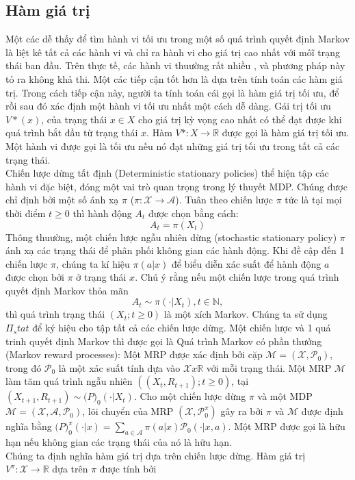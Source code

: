 \documentclass[14pt,a4paper,oneside]{report}		%
\begin{document}
\subsection{Hàm giá trị}
Một các dễ thấy để tìm hành vi tối ưu trong một số quá trình quyết định Markov là liệt kê tất cả các hành vi và chỉ ra hành vi cho giá trị cao nhất với môĩ trạng thái ban đầu. Trên thực tế, các hành vi thuường rất nhiều , và phương pháp này tỏ ra không khả thi. Một các tiếp cận tốt hơn là dựa trên tính toán các hàm giá trị. Trong cách tiếp cận này, người ta tính toán cái gọi là hàm giá trị tối ưu, để rồi sau đó xác định một hành vi tối ưu nhất một cách dễ dàng.
Gái trị tối ưu $V*(x)$, của trạng thái $x \in X$ cho giá trị kỳ vọng cao nhất có thể đạt được khi quá trình bắt đầu từ trạng thái $x$. Hàm $V* : X \rightarrow \mathbb{R}$ được gọi là hàm giá trị tối ưu. Một hành vi được gọi là tối ưu nếu nó đạt  những giá trị tối ưu trong tất cả các trạng thái.\\
Chiến lược dừng tất định (Deterministic stationary policies) thể hiện tập các hành vi đặc biệt, đóng một vai trò quan trọng trong lý thuyết MDP. Chúng được chỉ định bởi một số ánh xạ $\pi$ ($\pi : \mathcal{X}\rightarrow\mathcal{A}$). Tuân theo chiến lược $\pi$ tức là tại mọi thời điểm $t \geq 0$ thì hành động $A_t$ được chọn bằng cách:
\begin{equation} \label{eq6}
A_t = \pi (X_t)
\end{equation}
Thông thuường, một chiến lược ngẫu nhiên dừng (stochastic stationary policy) $\pi$ ánh xạ các trạng thái để phân phối không gian các hành động. Khi đề cập đến 1 chiến lược $\pi$, chúng ta kí hiệu $\pi (a|x)$ để biểu diễn xác suất để hành động $a$ được chọn bởi $\pi$ ở trạng thái $x$. Chú ý rằng nếu một chiến lược trong quá trình quyết định Markov thỏa mãn 
$$A_t  \sim \pi (\cdotp | X_t),  t \in \mathbb{N},$$ thì quá trình trạng thái $(X_t; t \geq 0)$ là một xích Markov. Chúng ta sử dụng $\Pi_stat$ để ký hiệu cho tập tất cả các chiến lược dừng.  Một chiến lược và 1 quá trinh quyết định Markov thì được gọi là Quá trình Markov có phần thưởng (Markov reward processes): Một MRP được xác định bởi cặp $\mathcal{M} = (\mathcal{X},\mathcal{P}_0)$, trong đó $\mathcal{P}_0$ là một xác suất tính dựa vào $\mathcal{X} x \mathbb{R}$ với mỗi trạng thái. Một MRP $\mathcal{M}$ làm tăm quá trình ngẫu nhiên $((X_t,R_{t+1});t\geq 0)$, tại $(X_{t+1},R_{t+1}) \sim \mathcal(P)_0(\cdotp | X_t)$. Cho một chiến lược dừng $\pi$ và một MDP $\mathcal{M} = (\mathcal{X},\mathcal{A},\mathcal{P}_0)$, lõi chuyển của MRP $(\mathcal{X},\mathcal{P}^\pi_0)$ gây ra bởi $\pi$ và $\mathcal{M}$ được định nghĩa bằng $\mathcal(P)^\pi_0(\cdotp|x) = \sum_{a \in \mathcal{A}} \pi(a|x)\mathcal{P}_0(\cdotp|x,a)$. Một MRP được gọi là hữu hạn nếu không gian các trạng thái của nó là hữu hạn.\\
Chúng ta định nghĩa hàm giá trị dựa trên chiến lược dừng. Hàm giá trị $V^\pi:\mathcal{X}\rightarrow\mathbb{R}$ dựa trên $\pi$ được tính bởi 
\end{document}
